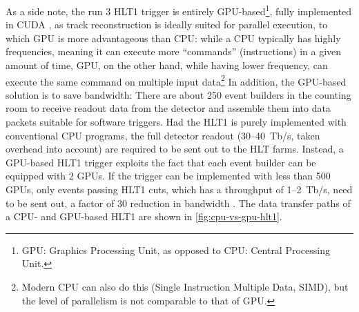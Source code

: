 As a side note, the run 3 HLT1 trigger is entirely GPU-based\footnote{
    GPU: Graphics Processing Unit, as opposed to CPU: Central Processing Unit.
}, fully implemented
in CUDA \cite{Allen_GPU_2020},
as track reconstruction is ideally suited for parallel execution,
to which GPU is more advantageous than CPU:
while a CPU typically has highly frequencies, meaning it can execute more
``commands'' (instructions) in a given amount of time,
GPU, on the other hand, while having lower frequency, can execute the same
command on multiple input data\footnote{
    Modern CPU can also do this (Single Instruction Multiple Data, SIMD),
    but the level of parallelism is not comparable to that of GPU.
}
In addition, the GPU-based solution is to save bandwidth:
There are about 250 event builders in the counting room to receive readout data
from the detector and assemble them into data packets suitable for software
triggers.
Had the HLT1 is purely implemented with conventional CPU programs,
the full detector readout (30--40~Tb/s, taken overhead into account) are
required to be sent out to the HLT farms.
Instead, a GPU-based HLT1 trigger exploits the fact that each event builder
can be equipped with 2 GPUs.
If the trigger can be implemented with less than 500 GPUs,
only events passing HLT1 cuts, which has a throughput of 1--2~Tb/s,
need to be sent out,
a factor of 30 reduction in bandwidth \cite{Allen_GPU_2020}.
The data transfer paths of a CPU- and GPU-based HLT1 are shown in
\cref{fig:cpu-vs-gpu-hlt1}.

